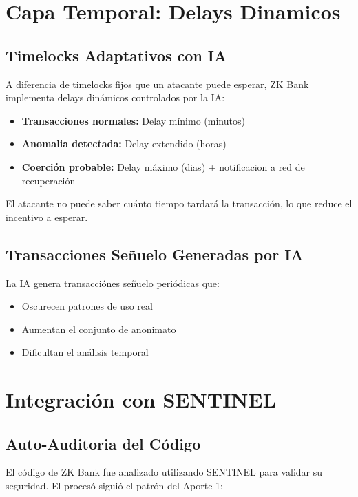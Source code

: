 \documentclass[12pt,a4paper,twoside]{book}
\begin{document}
\section{Capa Temporal: Delays Dinamicos}

\subsection{Timelocks Adaptativos con IA}

A diferencia de timelocks fijos que un atacante puede esperar, ZK Bank implementa delays dinámicos controlados por la IA:

\begin{itemize}
    \item \textbf{Transacciones normales:} Delay mínimo (minutos)
    \item \textbf{Anomalia detectada:} Delay extendido (horas)
    \item \textbf{Coerción probable:} Delay máximo (dias) + notificacion a red de recuperación
\end{itemize}

El atacante no puede saber cuánto tiempo tardará la transacción, lo que reduce el incentivo a esperar.

\subsection{Transacciones Señuelo Generadas por IA}

La IA genera transacciónes señuelo periódicas que:

\begin{itemize}
    \item Oscurecen patrones de uso real
    \item Aumentan el conjunto de anonimato
    \item Dificultan el análisis temporal
\end{itemize}

\section{Integración con SENTINEL}

\subsection{Auto-Auditoria del Código}

El código de ZK Bank fue analizado utilizando SENTINEL para validar su seguridad. El procesó siguió el patrón del Aporte 1:
\end{document}
